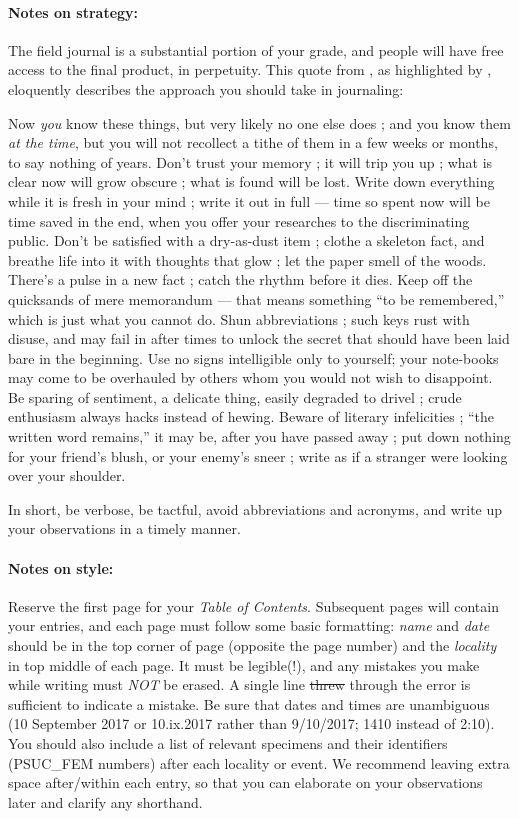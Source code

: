 \documentclass[letterpaper, 11pt]{article}
\begin{document}
\paragraph{Notes on strategy:} The field journal is a substantial portion of your grade, and people will have free access to the final product, in perpetuity. This quote from \citet[][pages 44--45]{bhl86279}, as highlighted by \cite{herman1986naturalist}, eloquently describes the approach you should take in journaling:\vspace{1mm}
\begin{displayquote}\small
Now \textit{you} know these things, but very likely no one else does ; and you know them \textit{at the time}, but you will not recollect a tithe of them in a few weeks or months, to say nothing of years. Don't trust your memory ; it will trip you up ; what is clear now will grow obscure ; what is found will be lost. Write down everything while it is fresh in your mind ; write it out in full --- time so spent now will be time saved in the end, when you offer your researches to the discriminating public. Don't be satisfied with a dry-as-dust item ; clothe a skeleton fact, and breathe life into it with thoughts that glow ; let the paper smell of the woods. There's a pulse in a new fact ; catch the rhythm before it dies. Keep off the quicksands of mere memorandum --- that means something ``to be remembered,'' which is just what you cannot do. Shun abbreviations ; such keys rust with disuse, and may fail in after times to unlock the secret that should have been laid bare in the beginning. Use no signs intelligible only to yourself; your note-books may come to be overhauled by others whom you would not wish to disappoint. Be sparing of sentiment, a delicate thing, easily degraded to drivel ; crude enthusiasm always hacks instead of hewing. Beware of literary infelicities ; ``the written word remains,'' it may be, after you have passed away ; put down nothing for your friend's blush, or your enemy's sneer ; write as if a stranger were looking over your shoulder.
\end{displayquote}
In short, be verbose, be tactful, avoid abbreviations and acronyms, and write up your observations in a timely manner.

\paragraph*{Notes on style:} Reserve the first page for your \textit{Table of Contents}. Subsequent pages will contain your entries, and each page must follow some basic formatting: \textit{name} and \textit{date} should be in the top corner of page (opposite the page number) and the \textit{locality} in top middle of each page. It must be legible(!), and any mistakes you make while writing must \textit{NOT} be erased. A single line \sout{threw} through the error is sufficient to indicate a mistake. Be sure that dates and times are unambiguous (10 September 2017 or 10.ix.2017 rather than 9/10/2017; 1410 instead of 2:10). You should also include a list of relevant specimens and their identifiers (PSUC\_FEM numbers) after each locality or event. We recommend leaving extra space after/within each entry, so that you can elaborate on your observations later and clarify any shorthand.
\end{document}
